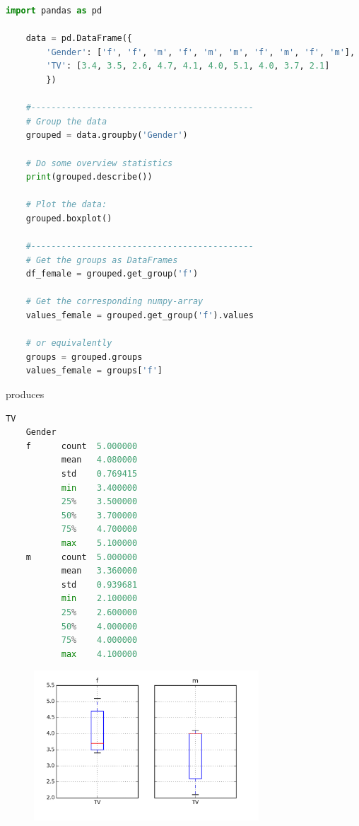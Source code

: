 \begin{lstlisting}[language=Python]
    import pandas as pd

    data = pd.DataFrame({
        'Gender': ['f', 'f', 'm', 'f', 'm', 'm', 'f', 'm', 'f', 'm'],
        'TV': [3.4, 3.5, 2.6, 4.7, 4.1, 4.0, 5.1, 4.0, 3.7, 2.1]
        })

    #--------------------------------------------
    # Group the data
    grouped = data.groupby('Gender')

    # Do some overview statistics
    print(grouped.describe())

    # Plot the data:
    grouped.boxplot()

    #--------------------------------------------
    # Get the groups as DataFrames
    df_female = grouped.get_group('f')

    # Get the corresponding numpy-array
    values_female = grouped.get_group('f').values

    # or equivalently
    groups = grouped.groups
    values_female = groups['f']

\end{lstlisting}

produces

\begin{lstlisting}[language=Python]
                        TV
    Gender
    f      count  5.000000
           mean   4.080000
           std    0.769415
           min    3.400000
           25%    3.500000
           50%    3.700000
           75%    4.700000
           max    5.100000
    m      count  5.000000
           mean   3.360000
           std    0.939681
           min    2.100000
           25%    2.600000
           50%    4.000000
           75%    4.000000
           max    4.100000
\end{lstlisting}

\begin{figure}[H]
  \centering
  \includegraphics[width=0.75\textwidth]{../Images/grouped.png}\\
\end{figure}

